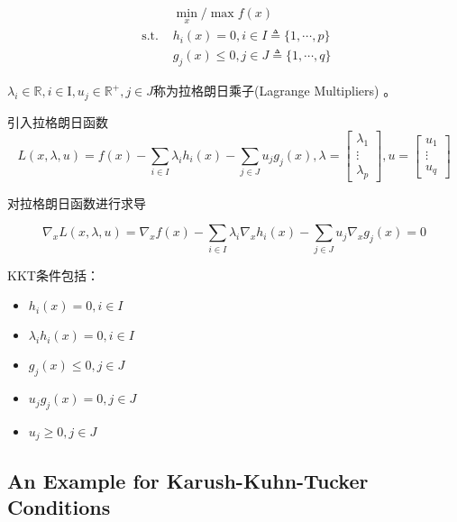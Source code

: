 \begin{definition}
    $$\begin{aligned}
        &\min _{x} / \max f(x) \\
\text{ s.t. } & h_{i}(x)=0, i \in I \triangleq\{1, \cdots, p\} \\
&g_{j}(x) \leq 0, j \in J \triangleq\{1, \cdots, q\}
    \end{aligned}$$

$ \lambda_{i} \in \mathbb{R}, i \in \mathrm{I}, u_{j} \in \mathbb{R}^{+}, j \in J $称为拉格朗日乘子(Lagrange Multipliers) 。

引入拉格朗日函数 $$ L(x, \lambda, u)=f(x)-\sum_{i \in I} \lambda_{i} h_{i}(x)-\sum_{j \in J} u_{j} g_{j}(x),  \lambda=\left[\begin{array}{c}\lambda_{1} \\ \vdots \\ \lambda_{p}\end{array}\right], u=\left[\begin{array}{c}u_{1} \\ \vdots \\ u_{q}\end{array}\right] $$

对拉格朗日函数进行求导

$$ \nabla_{x} L(x, \lambda, u)=\nabla_{x} f(x)-\sum_{i \in I} \lambda_{i} \nabla_{x} h_{i}(x)-\sum_{j \in J} u_{j} \nabla_{x} g_{j}(x)=0 $$
\end{definition}

\begin{theorem} KKT条件包括：
\begin{itemize}
    \item $ h_{i}(x)=0, i \in I $
    \item $ \lambda_{i} h_{i}(x)=0, i \in I $
    \item $ g_{j}(x) \leq 0, j \in J $
    \item $ u_{j} g_{j}(x)=0, j \in J $
    \item $ u_{j} \geq 0, j \in J $
\end{itemize}

\end{theorem}


\subsection{An Example for Karush-Kuhn-Tucker Conditions}



